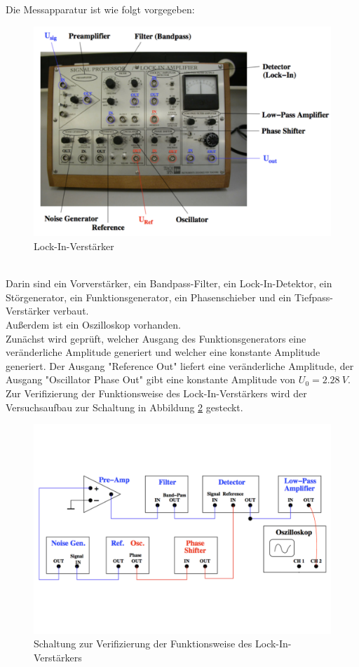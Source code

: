Die Messapparatur ist wie folgt vorgegeben:
\begin{figure}[h!]
  \centering
  \includegraphics[width=\textwidth]{LockIn.pdf}
  \caption{Lock-In-Verstärker \cite{1}}
  \label{fig:LIV}
\end{figure}
\\Darin sind ein Vorverstärker, ein Bandpass-Filter, ein Lock-In-Detektor, ein Störgenerator, ein Funktionsgenerator, ein Phasenschieber und ein Tiefpass-Verstärker verbaut.
\\Außerdem ist ein Oszilloskop vorhanden.
\\Zunächst wird geprüft, welcher Ausgang des Funktionsgenerators eine veränderliche Amplitude generiert und welcher eine konstante Amplitude generiert.
Der Ausgang "Reference Out" liefert eine veränderliche Amplitude, der Ausgang "Oscillator Phase Out" gibt eine konstante Amplitude von $U_{0}=\SI{2.28}{V}$.
\\Zur Verifizierung der Funktionsweise des Lock-In-Verstärkers wird der Versuchsaufbau zur Schaltung in Abbildung \ref{fig:LockIn} gesteckt.
\begin{figure}[h!]
  \centering
  \includegraphics[width=\textwidth]{LockInSchaltung.pdf}
  \caption{Schaltung zur Verifizierung der Funktionsweise des Lock-In-Verstärkers \cite{1}}
  \label{fig:LockIn}
\end{figure}
